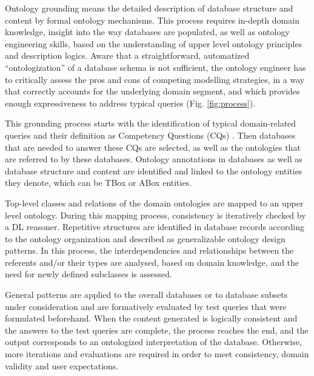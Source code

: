 Ontology grounding means the detailed description of database structure and content by formal ontology mechanisms. This process requires in-depth domain knowledge, insight into the way databases are populated, as well as ontology engineering skills, based on the understanding of upper level ontology principles and description logics.
Aware that a straightforward,  automatized ``ontologization'' of a database schema is not sufficient, the ontology engineer has to critically assess the pros and cons of competing modelling strategies, in a way that correctly accounts for the underlying domain segment, and which provides enough expressiveness to address typical queries (Fig. \ref{fig:process}). 

This grounding process starts with the identification of typical domain-related queries and their definition as Competency Questions (CQs) \citep{Gruninger1994}. Then databases that are needed to answer these CQs are selected, as well as the ontologies that are referred to by these databases. Ontology annotations in databases as well as database structure and content are identified and linked to the ontology entities they denote, which can be TBox or ABox entities. 

Top-level classes and relations of the domain ontologies are mapped to an upper level ontology. During this mapping process, consistency is iteratively checked by a DL reasoner. Repetitive structures are identified in database records according to the ontology organization and described as generalizable ontology design patterns. In this process, the interdependencies and relationships between the referents and/or their types are analysed, based on domain knowledge, and the need for newly defined subclasses is assessed. 

General patterns are applied to the overall databases or to database subsets under consideration and are formatively evaluated by test queries that were formulated beforehand. When the content generated is logically consistent and the answers to the test queries are complete, the process reaches the end, and the output corresponds to an ontologized interpretation of the database. Otherwise, more iterations and evaluations are required in order to meet consistency, domain validity and user expectations. 
  

